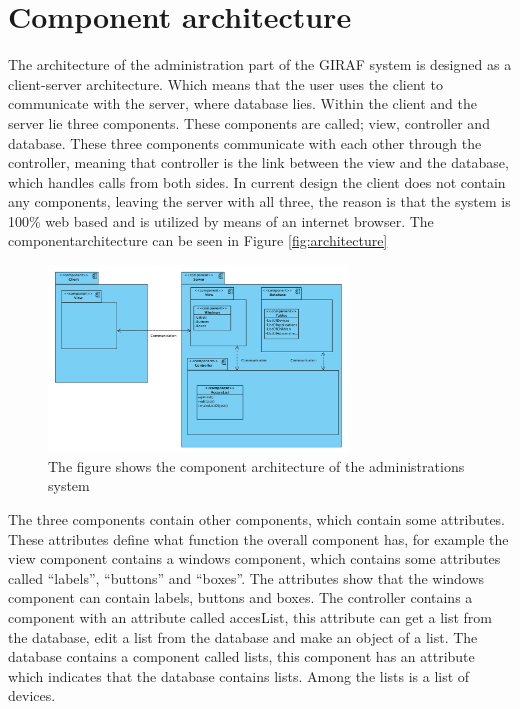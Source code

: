 \section{Component architecture}

The architecture of the administration part of the GIRAF system is designed as a client-server architecture. Which means that the user uses the client to communicate with the server, where database lies. Within the client and the server lie three components. These components are called; view, controller and database. These three components communicate with each other through the controller, meaning that controller is the link between the view and the database, which handles calls from both sides. In current design the client does not contain any components, leaving the server with all three, the reason is that the system is 100\% web based and is utilized by means of an internet browser. The componentarchitecture can be seen in Figure \vref{fig:architecture}

\begin{figure}[!ht]
\centering
\includegraphics[width=300px]{img/ComponentArketektur.png}
\caption{The figure shows the component architecture of the administrations system}
\label{fig:architecture}
\end{figure}

The three components contain other components, which contain some attributes. These attributes define what function the overall component has, for example the view component contains a windows component, which contains some attributes called ``labels'', ``buttons'' and ``boxes''. The attributes show that the windows component can contain labels, buttons and boxes.
The controller contains a component with an attribute called accesList, this attribute can get a list from the database, edit a list from the database and make an object of a list.
The database contains a component called lists, this component has an attribute which indicates that the database contains lists. Among the lists is a list of devices.